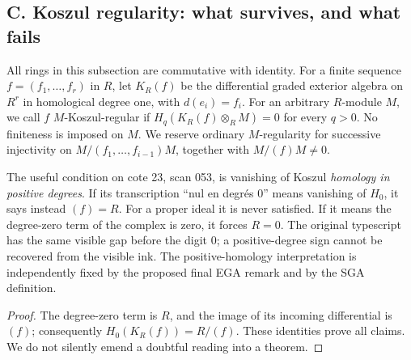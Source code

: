 \subsection{C. Koszul regularity: what survives, and what fails}

All rings in this subsection are commutative with identity.  For a finite
sequence $f=(f_1,\ldots,f_r)$ in $R$, let $K_R(f)$ be the differential
graded exterior algebra on $R^r$ in homological degree one, with
$d(e_i)=f_i$.  For an arbitrary $R$-module $M$, we call $f$
$M$-Koszul-regular if $H_q(K_R(f)\otimes_R M)=0$ for every $q>0$.
No finiteness is imposed on $M$.  We reserve ordinary $M$-regularity for
successive injectivity on $M/(f_1,\ldots,f_{i-1})M$, together with
$M/(f)M\ne0$.

\begin{proposition}\label{SA23-C-1}
The useful condition on cote 23, scan 053, is vanishing of Koszul
\emph{homology in positive degrees}.  If its transcription ``nul en
degr\'es $0$'' means vanishing of $H_0$, it says instead $(f)=R$.
For a proper ideal it is never satisfied.  If it means the degree-zero
term of the complex is zero, it forces $R=0$.
The original typescript has the same visible gap before the digit
$0$; a positive-degree sign cannot be recovered from the visible
ink.  The positive-homology interpretation is independently fixed
by the proposed final EGA remark and by the SGA definition.
\cite[physical PDF pp.~53--54, archive footer pp.~52--53]{algManuscript23}
\cite[IV 19.1.8, p.~189]{algEGAIV4}
\cite[VII 1.1, p.~416]{algSGA6}
\end{proposition}
\begin{proof}
The degree-zero term is $R$, and the image of its incoming differential
is $(f)$; consequently $H_0(K_R(f))=R/(f)$.  These identities prove all
claims.  We do not silently emend a doubtful reading into a theorem.
\end{proof}

